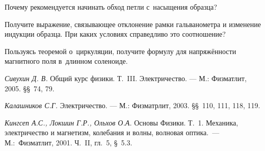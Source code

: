 \begin{lab:questions}
	
	\item Почему рекомендуется начинать обход петли с~насыщения образца?
	
	\item Получите выражение, связывающее отклонение рамки гальванометра и изменение индукции образца. При каких условиях
	справедливо это соотношение?
	
	\item Пользуясь теоремой о~циркуляции, получите формулу для напряжённости магнитного поля в~длинном соленоиде.

\end{lab:questions}

\begin{lab:literature}
	
	\item \emph{Сивухин Д. В.} Общий курс физики. Т.~III. Электричество. --- М.: Физматлит, 2005. \S\S~74, 79.
	
	\item \emph{Калашников С.Г.} Электричество. --- М.: Физматрлит, 2003. \S\S~110, 111, 118, 119.
	
	\item \emph{Кингсеп А.С., Локшин Г.Р., Ольхов О.А.} Основы Физики. Т.~1. Механика, электричество и магнетизм, колебания и
	волны, волновая оптика.~--- М.:~Физматлит, 2001. Ч.~II, гл.~5, \S~5.3.
	
\end{lab:literature}
